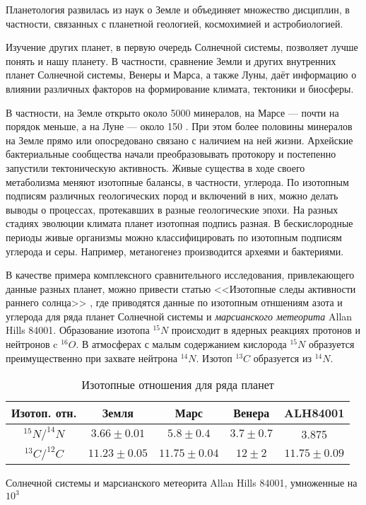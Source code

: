\documentclass[a5paper,openany]{book}
\begin{document}
Планетология развилась из наук о Земле %
и объединяет множество дисциплин, в частности, связанных с планетной геологией, космохимией и астробиологией.

Изучение других планет, в первую очередь Солнечной системы, позволяет лучше понять и нашу планету.
В частности, сравнение Земли и других внутренних планет Солнечной системы, Венеры и Марса, а также Луны, даёт информацию о влиянии различных факторов на формирование климата, тектоники и биосферы.

В частности, на Земле открыто около 5000 минералов, на Марсе --- почти на порядок меньше, а на Луне --- около 150 \cite{Zhuravlev2019}. При этом более половины минералов на Земле прямо или опосредовано связано с наличием на ней жизни. Архейские бактериальные сообщества начали преобразовывать протокору и постепенно запустили тектоническую активность. Живые существа в ходе своего метаболизма меняют изотопные балансы, в частности, углерода. По изотопным подписям различных геологических пород и включений в них, можно делать выводы о процессах, протекавших в разные геологические эпохи. На разных стадиях эволюции климата планет изотопная подпись разная. В бескислородные периоды живые организмы можно классифицировать по изотопным подписям углерода и серы. Например, метаногенез производится археями и бактериями. 

В качестве примера 	комплексного сравнительного исследования, привлекающего данные разных планет,
можно привести статью <<Изотопные следы активности раннего солнца>> \cite{IsotopeTraceEarlySun2022}, где приводятся данные по изотопным отншениям азота и углерода для ряда планет Солнечной системы и \emph{марсианского метеорита}  Allan Hills 84001. 
Образование изотопа $^{15}N$ происходит в ядерных реакциях протонов и нейтронов c $^{16}O$. В атмосферах с малым содержанием кислорода $^{15}N$  образуется преимущественно при захвате нейтрона $^{14}N$. Изотоп $^{13}C$ образуется из $^{14}N$.	
\begin{table}[h!]
	\begin{center}	
			\begin{tabular}{|c|cccc|}
				\hline 
				Изотоп. отн.  & Земля &  Марс  & Венера & ALH84001   \\
				\hline 
				$^{15}N / ^{14}N$ & $3.66 \pm 0.01$ & $5.8 \pm 0.4$ & $3.7 \pm 0.7$ & 3.875\\ [1mm]
				$^{13}C / ^{12}C$ & $11.23 \pm 0.05$ & $11.75 \pm 0.04$ & $12 \pm 2$ &  $11.75 \pm 0.09$ \\ [1mm]
				\hline 
			\end{tabular}
			\caption{Изотопные отношения для ряда планет} 
			{\small Солнечной системы и марсианского метеорита Allan Hills 84001, умноженные на $10^3$}
			\label{t:PlanetsIsotope}
	\end{center}
\end{table} 
\end{document}
